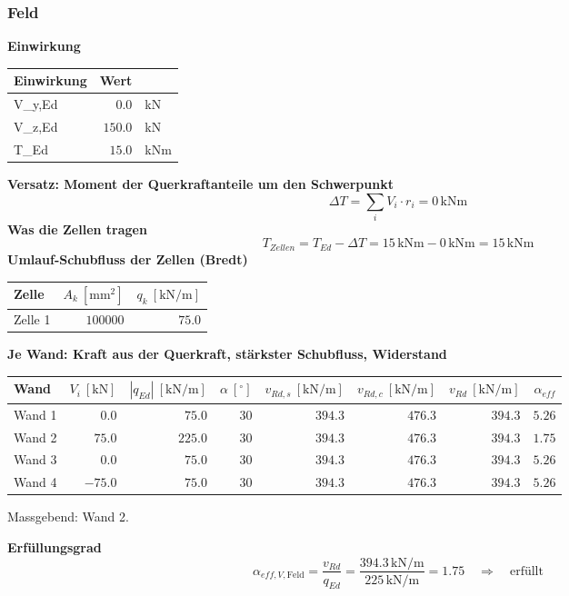 \documentclass[11pt,a4paper]{article}
\begin{document}
\subsubsection{Feld}
\noindent\textbf{Einwirkung}
\begin{longtable}{lrl}
\hline
Einwirkung & Wert &  \\
\hline
\endhead
V\_y,Ed & $0.0$ & kN \\
V\_z,Ed & $150.0$ & kN \\
T\_Ed & $15.0$ & kNm \\
\hline
\end{longtable}
\noindent\textbf{Versatz: Moment der Querkraftanteile um den Schwerpunkt}
\begin{equation*}
\Delta T = \sum_i V_i \cdot r_i = 0\,\mathrm{kNm}
\end{equation*}
\noindent\textbf{Was die Zellen tragen}
\begin{equation*}
T_{Zellen} = T_{Ed} - \Delta T = 15\,\mathrm{kNm} - 0\,\mathrm{kNm} = 15\,\mathrm{kNm}
\end{equation*}
\noindent\textbf{Umlauf-Schubfluss der Zellen (Bredt)}
\begin{longtable}{lrr}
\hline
Zelle & $A_k\ [\mathrm{mm}^2]$ & $q_k\ [\mathrm{kN/m}]$ \\
\hline
\endhead
Zelle 1 & $100000$ & $75.0$ \\
\hline
\end{longtable}
\noindent\textbf{Je Wand: Kraft aus der Querkraft, stärkster Schubfluss, Widerstand}
\begin{longtable}{lrrrrrrr}
\hline
Wand & $V_i\ [\mathrm{kN}]$ & $|q_{Ed}|\ [\mathrm{kN/m}]$ & $\alpha\ [{}^{\circ}]$ & $v_{Rd,s}\ [\mathrm{kN/m}]$ & $v_{Rd,c}\ [\mathrm{kN/m}]$ & $v_{Rd}\ [\mathrm{kN/m}]$ & $\alpha_{eff}$ \\
\hline
\endhead
Wand 1 & $0.0$ & $75.0$ & $30$ & $394.3$ & $476.3$ & $394.3$ & $5.26$ \\
Wand 2 & $75.0$ & $225.0$ & $30$ & $394.3$ & $476.3$ & $394.3$ & $1.75$ \\
Wand 3 & $0.0$ & $75.0$ & $30$ & $394.3$ & $476.3$ & $394.3$ & $5.26$ \\
Wand 4 & $-75.0$ & $75.0$ & $30$ & $394.3$ & $476.3$ & $394.3$ & $5.26$ \\
\hline
\end{longtable}
Massgebend: Wand 2.

\noindent\textbf{Erfüllungsgrad}
\begin{equation*}
\alpha_{eff,V,\text{Feld}} = \frac{v_{Rd}}{q_{Ed}} = \frac{394.3\,\mathrm{kN}/\mathrm{m}}{225\,\mathrm{kN}/\mathrm{m}} = 1.75 \quad \Rightarrow \quad \text{erfüllt}
\end{equation*}
\end{document}
